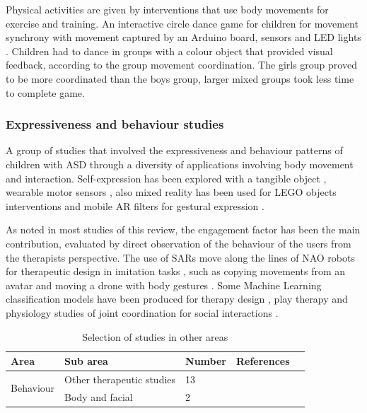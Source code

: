 \documentclass[a4paper,fleqn]{cas-sc}
\begin{document}
Physical activities are given by interventions that use body movements for exercise and training.
An interactive circle dance game for children for movement synchrony with movement captured by an Arduino board, sensors and LED lights \cite{Baharin19}. Children had to dance in groups with a colour object that provided visual feedback, according to the group movement coordination. The girls group proved to be more coordinated than the boys group, larger mixed groups took less time to complete game.

\subsubsection{Expressiveness and behaviour studies}
\label{sec:app-expression}
A group of studies that involved the expressiveness and behaviour patterns of children with ASD through a diversity of applications involving body movement and interaction. Self-expression has been explored with a tangible object \cite{Wilson20}, wearable motor sensors \cite{Giomi18}, also mixed reality has been used for LEGO objects interventions \cite{Sayis21} and mobile AR filters for gestural expression \cite{Pohl20}.

As noted in most studies of this review, the engagement factor has been the main contribution, evaluated by direct observation of the behaviour of the users from the therapists perspective. The use of SARs move along the lines of NAO robots for therapeutic design in imitation tasks \cite{Chevalier17, Geminiani19}, such as copying movements from an avatar \cite{Santos20, Santos21} and moving a drone with body gestures \cite{Ascensao22}. Some Machine Learning classification models have been produced for therapy design \cite{Zampella21}, play therapy \cite{Li21} and physiology studies of joint coordination for social interactions \cite{Whyatt17}.

\begin{table}[h]
\centering
\begin{center}
\begin{tabular*}{6.2in}{p{0.85in}|p{0.82in}|p{0.35in}|p{3.5in}p{0in}}
\hline
Area   & Sub area   & Number & References  &  \\ \hline
\multirow{2}{*}{Behaviour}   
    & Other therapeutic studies  & 13 & \cite{Ascensao22,Li22,Li21,Santos21,
    Sayis21,Zampella21,Rosly20,Wilson20,Javed19,Geminiani19,Sorce18, Chevalier17,Whyatt17} &  \\ \cline{1-4}
\multirow{1}{*}{\centering Expression} 
    & Body and facial     & 2     & \cite{Pohl20, Giomi18}  & 
    \\ \cline{1-4}
\end{tabular*}
\caption{Selection of studies in other areas}
\label{TABLE:area-other}
\end{center}
\end{table}
\end{document}
